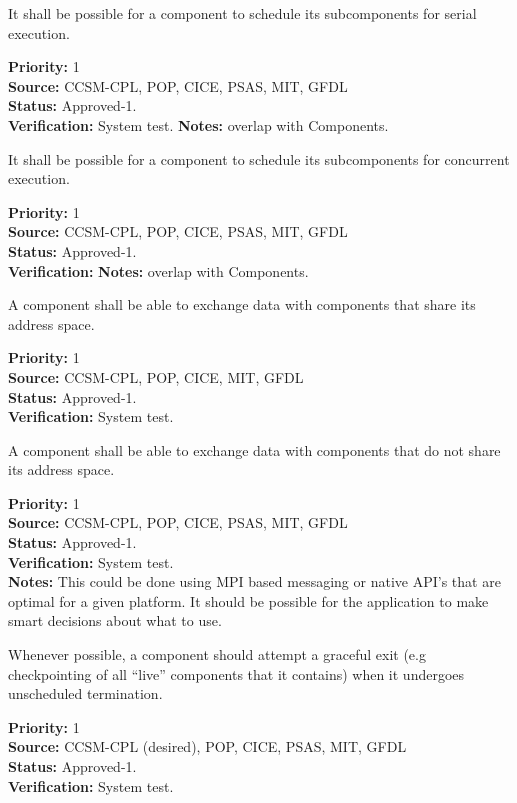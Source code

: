 It shall be possible for a component to schedule its subcomponents 
for serial execution. \\
\begin{reqlist}
{\bf Priority:} 1 \\ 
{\bf Source:}  CCSM-CPL, POP, CICE, PSAS, MIT, GFDL \\
{\bf Status:} Approved-1. \\
{\bf Verification:} System test.
{\bf Notes:} overlap with Components.
\end{reqlist}

It shall be possible for a component to schedule its subcomponents 
for concurrent execution.
\begin{reqlist}
{\bf Priority:}  1 \\ 
{\bf Source:}  CCSM-CPL, POP, CICE, PSAS, MIT, GFDL \\
{\bf Status:} Approved-1. \\
{\bf Verification:} 
{\bf Notes:} overlap with Components.
\end{reqlist}

A component shall be able to exchange data with components that share 
its address space.
\begin{reqlist}
{\bf Priority:} 1 \\ 
{\bf Source:}  CCSM-CPL, POP, CICE, MIT, GFDL \\
{\bf Status:} Approved-1. \\
{\bf Verification:} System test.
\end{reqlist}

A component shall be able to exchange data with components that do
not share its address space.
\begin{reqlist}
{\bf Priority:} 1 \\
{\bf Source:}  CCSM-CPL, POP, CICE, PSAS, MIT, GFDL \\
{\bf Status:} Approved-1. \\
{\bf Verification:} System test. \\ 
{\bf Notes:}  This could be done using MPI based messaging or native
  API's that are optimal for a given platform. It should be possible
  for the application to make smart decisions about what to use.
\end{reqlist}

Whenever possible, a component should attempt a graceful exit
(e.g checkpointing of all ``live'' components that it contains) 
when it undergoes unscheduled termination.
\begin{reqlist}
{\bf Priority:} 1 \\
{\bf Source:}  CCSM-CPL (desired), POP, CICE, PSAS, MIT, GFDL \\
{\bf Status:} Approved-1. \\
{\bf Verification:} System test.
\end{reqlist}

